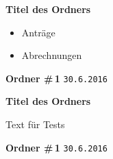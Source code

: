 \documentclass[12pt]{article}
\begin{document}
\begin{center}
  \large \textbf{Titel des Ordners}
  
  \vspace{\fill}  
  
  \begin{itemize}
  	\item Anträge
  	\item Abrechnungen
  \end{itemize}

  \vspace{\fill}

  \textbf{Ordner \#\,1}
  \texttt{30.6.2016}
\end{center}

\newpage

\begin{center}
  \large \textbf{Titel des Ordners}
    
  \vspace{\fill}
  
  Text für Tests

  \vspace{\fill}

  \textbf{Ordner \#\,1}
  \texttt{30.6.2016}
\end{center}

\end{document}
